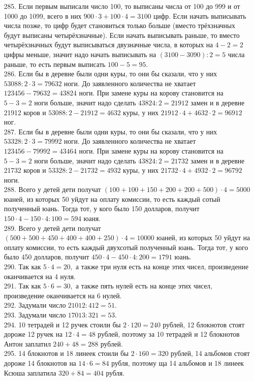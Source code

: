 285. Если первым выписали число 100, то выписаны числа от 100 до 999 и от 1000 до 1099, всего в них $900\cdot3+100\cdot4=3100$ цифр. Если начать выписывать числа позже, то цифр будет становиться только больше (вместо трёхзначных будут выписаны четырёхзначные). Если начать выписывать раньше, то вместо четырёхзначных будут выписываться двузначные числа, в которых на $4-2=2$ цифры меньше, значит надо начать выписывать на $(3100-3090):2=5$ числа раньше, то есть первым выписать $100-5=95.$\\
286. Если бы в деревне были одни куры, то они бы сказали, что у них $53088:2\cdot3=79632$ ноги. До заявленного количества не хватает $123456-79632=43824$ ноги. При замене куры на корову становится на $5-3=2$ ноги больше, значит надо сделать $43824:2=21912$ замен и в деревне 21912 коров и $53088:2-21912=4632$ куры, у них $21912\cdot4+4632\cdot2=96912$ ног.\\
287. Если бы в деревне были одни куры, то они бы сказали, что у них $53328:2\cdot3=79992$ ноги. До заявленного количества не хватает $123456-79992=43464$ ноги. При замене куры на корову становится на $5-3=2$ ноги больше, значит надо сделать $43824:2=21732$ замен и в деревне 21732 коров и $53328:2-21732=4932$ куры, у них $21732\cdot4+4932\cdot2=96792$ ноги.\\
288. Всего у детей дети получат $(100+100+150+200+200+500)\cdot4=5000$ юаней, из которых 50 уйдут на оплату комиссии, то есть каждый сотый полученный юань. Тогда тот, у кого было 150 долларов, получит $150\cdot4-150\cdot4:100=594$ юаня.\\
289. Всего у детей дети получат $(500+500+450+400+400+250)\cdot4=10000$ юаней, из которых 50 уйдут на оплату комиссии, то есть каждый двухсотый полученный юань. Тогда тот, у кого было 450 долларов, получит $450\cdot4-450\cdot4:200=1791$ юань.\\
290. Так как $5\cdot4=20,$ а также три нуля есть на конце этих чисел, произведение оканчивается на 4 нуля.\\
291. Так как $5\cdot6=30,$ а также пять нулей есть на конце этих чисел, произведение оканчивается на 6 нулей.\\
292. Задумали число $21012:412=51.$\\
293. Задумали число $17013:321=53.$\\
294. 10 тетрадей и 12 ручек стоили бы $2\cdot120=240$ рублей, 12 блокнотов стоят дороже 12 ручек на $12\cdot4=48$ рублей, поэтому за 10 тетрадей и 12 блокнотов Антон заплатил $240+48=288$ рублей.\\
295. 14 блокнотов и 18 линеек стоили бы $2\cdot160=320$ рублей, 14 альбомов стоят дороже 14 блокнотов на $14\cdot6=84$ рубля, поэтому ща 14 альбомов и 18 линеек Ксюша заплатила $320+84=404$ рубля.\\
